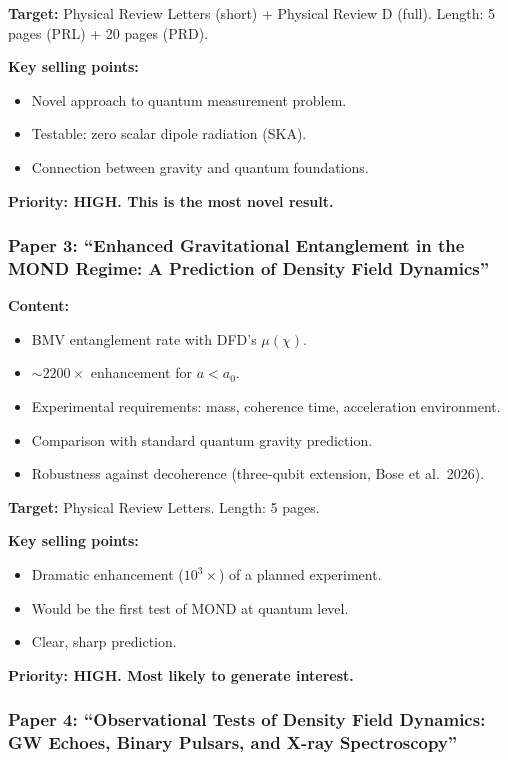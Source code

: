 \documentclass[11pt,a4paper]{article}
\begin{document}
\textbf{Target:} Physical Review Letters (short) + Physical Review D (full). Length: 5 pages (PRL) + 20 pages (PRD).

\textbf{Key selling points:}
\begin{itemize}
\item Novel approach to quantum measurement problem.
\item Testable: zero scalar dipole radiation (SKA).
\item Connection between gravity and quantum foundations.
\end{itemize}

\textbf{Priority: HIGH. This is the most novel result.}

\subsubsection{Paper 3: ``Enhanced Gravitational Entanglement in the MOND Regime: A Prediction of Density Field Dynamics''}

\textbf{Content:}
\begin{itemize}
\item BMV entanglement rate with DFD's $\mu(\chi)$.
\item $\sim 2200\times$ enhancement for $a < a_0$.
\item Experimental requirements: mass, coherence time, acceleration environment.
\item Comparison with standard quantum gravity prediction.
\item Robustness against decoherence (three-qubit extension, Bose et al.\ 2026).
\end{itemize}

\textbf{Target:} Physical Review Letters. Length: 5 pages.

\textbf{Key selling points:}
\begin{itemize}
\item Dramatic enhancement ($10^3\times$) of a planned experiment.
\item Would be the first test of MOND at quantum level.
\item Clear, sharp prediction.
\end{itemize}

\textbf{Priority: HIGH. Most likely to generate interest.}

\subsubsection{Paper 4: ``Observational Tests of Density Field Dynamics: GW Echoes, Binary Pulsars, and X-ray Spectroscopy''}
\end{document}
